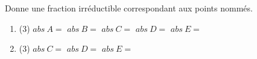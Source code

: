 %
%
Donne une fraction irréductible correspondant aux points
  nommés.
  \begin{enumerate}
    \item
          \begin{tasks}(3)
            \task $abs~A =$
            \task $abs~B =$
            \task $abs~C =$
            \task $abs~D =$
            \task $abs~E = $
          \end{tasks}
    \item
          \begin{tasks}(3)
            \task $abs~C =$
            \task $abs~D =$
            \task $abs~E = $
          \end{tasks}
  \end{enumerate}
